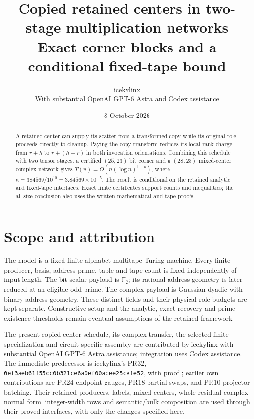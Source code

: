 \documentclass[11pt]{article}
\title{Copied retained centers in two-stage multiplication networks\\
\large Exact corner blocks and a conditional fixed-tape bound}
\author{icekylinx\\\small With substantial OpenAI GPT-6 Astra and Codex assistance}
\date{8 October 2026}
\begin{document}
\maketitle
\begin{abstract}
A retained center can supply its scatter from a transformed copy while
its original role proceeds directly to cleanup. Paying the copy transform
reduces its local rank charge from $r+h$ to $r+(h-r)$ in both invocation
orientations. Combining this schedule with two tensor stages, a certified
$(25,23)$ bit corner and a $(28,28)$ mixed-center complex network gives
$T(n)=O(n(\log n)^{1-\kappa})$, where
$\kappa=384569/10^{10}=3.84569\times10^{-5}$.
The result is conditional on the retained analytic and fixed-tape
interfaces. Exact finite certificates support counts and inequalities;
the all-size conclusion also uses the written mathematical and tape proofs.
\end{abstract}

\section{Scope and attribution}
The model is a fixed finite-alphabet multitape Turing machine. Every
finite producer, basis, address prime, table and tape count is fixed
independently of input length. The bit scalar payload is $\mathbb F_2$;
its rational address geometry is later reduced at an eligible odd prime.
The complex payload is Gaussian dyadic with binary address geometry.
These distinct fields and their physical role budgets are kept separate.
Constructive setup and the analytic, exact-recovery and prime-existence
thresholds remain eventual assumptions of the retained framework.

The present copied-center schedule, its complex transfer, the selected
finite specialization and circuit-specific assembly are contributed by
icekylinx with substantial OpenAI GPT-6 Astra assistance; integration
uses Codex assistance. The immediate predecessor is icekylinx's PR32,
\texttt{0ef3aeb61f55cc0b321ce6a0ef00acee25cefe52}, with proof
; earlier own contributions are
PR24 endpoint gauges, PR18 partial swaps, and PR10 projector batching.
Their retained producers, labels, mixed centers, whole-residual complex
normal form, integer-width rows and semantic/bulk composition are used
through their proved interfaces, with only the changes specified here.
\end{document}
